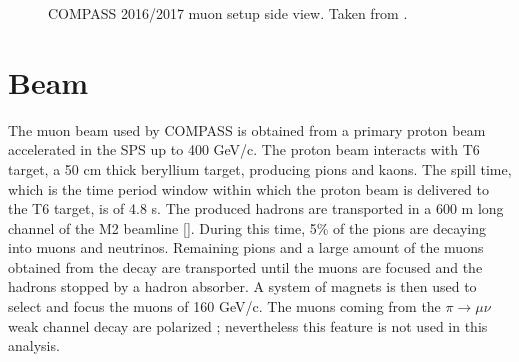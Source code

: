 \begin{figure}[!h]
  \centering
	\caption{COMPASS 2016/2017 muon setup side view. Taken from \cite{NIM}.}
	\label{pic:apparatus}
\end{figure}


\section{Beam}\label{sec:beam}

The muon beam used by COMPASS is obtained from a primary proton beam accelerated in the SPS up to 400 GeV/c. The proton beam interacts with T6 target, a 50 cm thick beryllium target, producing pions and kaons. The spill time, which is the time period window within which the proton beam is delivered to the T6 target, is of 4.8 s. The produced hadrons are transported in a 600 m long channel of the M2 beamline \ref{}. During this time, 5\% of the pions are decaying into muons and neutrinos. Remaining pions and a large amount of the muons obtained from the decay are transported until the muons are focused and the hadrons stopped by a hadron absorber. A system of magnets is then used to select and focus
the muons of 160 GeV/c. The muons coming from the $\pi \rightarrow \mu\nu$ weak channel decay are polarized ; nevertheless this feature is not used in this analysis.

